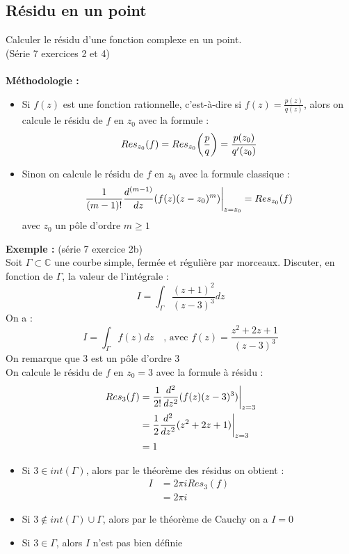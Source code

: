 \subsection{Résidu en un point}
Calculer le résidu d’une fonction complexe en un point. \\
(Série 7 exercices 2 et 4) \\
\\
\textbf{Méthodologie :}
\begin{itemize}
    \item Si $f(z)$ est une fonction rationnelle, c'est-à-dire si $f(z) = \frac{p(z)}{q(z)}$, alors on calcule le résidu de $f$ en $z_0$ avec la formule :
    $$Res_{z_0}(f) = Res_{z_0}\bigg{(}\frac{p}{q}\bigg{)} = \frac{p(z_0)}{q'(z_0)}$$
    \item Sinon on calcule le résidu de $f$ en $z_0$ avec la formule classique :
    $$\frac{1}{(m-1)!}\frac{d^{(m-1)}}{dz}(f(z)(z-z_0)^m)\bigg{|}_{z=z_0} = Res_{z_0}(f)$$
    avec $z_0$ un pôle d'ordre $m \geq 1$
\end{itemize}
\textbf{Exemple :} (série 7 exercice 2b) \\
Soit $\Gamma \subset \mathbb{C}$ une courbe simple, fermée et régulière par morceaux. Discuter, en fonction de $\Gamma$, la valeur de l'intégrale :
$$I = \int_{\Gamma} \frac{(z+1)^2}{(z-3)^3}dz$$
On a :
$$I = \int_{\Gamma} f(z)dz \quad \text{, avec } f(z) = \frac{z^2+2z+1}{(z-3)^3}$$
On remarque que $3$ est un pôle d'ordre $3$ \\
On calcule le résidu de $f$ en $z_0 = 3$ avec la formule à résidu :
\begin{align*}
    Res_3(f) &= \frac{1}{2!} \frac{d^2}{dz^2}(f(z)(z-3)^3) \bigg{|}_{z=3} \\
    &= \frac{1}{2} \frac{d^2}{dz^2}(z^2+2z+1) \bigg{|}_{z=3} \\
    &= 1
\end{align*}
\begin{itemize}
    \item Si $3 \in int(\Gamma)$, alors par le théorème des résidus on obtient :
    \begin{align*}
        I &= 2\pi i Res_3(f) \\
        &= 2\pi i
    \end{align*}
    \item Si $3 \notin int(\Gamma) \cup \Gamma$, alors par le théorème de Cauchy on a $I = 0$
    \item Si $3 \in \Gamma$, alors $I$ n'est pas bien définie
\end{itemize}
